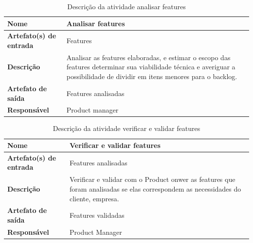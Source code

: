     \begin{table}[H]
        \centering
        \label{descricaoAtividades9}
        \caption{Descrição da atividade analisar features}
            \begin{tabular}{|l|p{10cm}|}
            \hline
            \textbf{Nome} & Analisar features \\
            \hline
            \textbf{Artefato(s) de entrada} & Features \\
            \hline
            \textbf{Descrição} & Analisar as features elaboradas, e estimar o escopo das features determinar sua viabilidade técnica e averiguar a possibilidade de dividir em itens menores para o backlog. \\
            \hline
            \textbf{Artefato de saída} & Features analisadas \\
            \hline
            \textbf{Responsável} & Product manager \\
            \hline
        \end{tabular}
    \end{table}

    \begin{table}[H]
        \centering
        \label{descricaoAtividades10}
        \caption{Descrição da atividade verificar e validar features}
            \begin{tabular}{|l|p{10cm}|}
            \hline
            \textbf{Nome} & Verificar e validar features \\
            \hline
            \textbf{Artefato(s) de entrada} & Features analisadas \\
            \hline
            \textbf{Descrição} & Verificar e validar com o Product onwer as features que foram analisadas se elas correspondem as necessidades do cliente, empresa. \\
            \hline
            \textbf{Artefato de saída} & Features validadas \\
            \hline
            \textbf{Responsável} & Product Manager \\
            \hline
        \end{tabular}
    \end{table}

